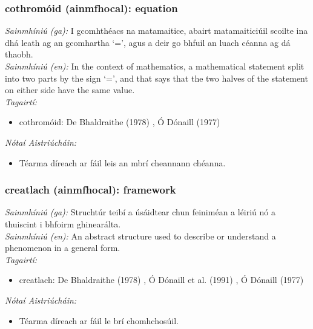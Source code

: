 \subsubsection*{cothromóid (ainmfhocal): equation}
 \noindent \textit{Sainmhíniú (ga):} I gcomhthéacs na matamaitice, abairt matamaiticiúil scoilte ina dhá leath ag an gcomhartha `=', agus a deir go bhfuil an luach céanna ag dá thaobh.
\\
 \noindent \textit{Sainmhíniú (en):} In the context of mathematics, a mathematical statement split into two parts by the sign `=', and that says that the two halves of the statement on either side have the same value.
\\
 \noindent \textit{Tagairtí:}
\begin{itemize}
	\item cothromóid: De Bhaldraithe (1978) \cite{de-bhaldraithe}, Ó Dónaill (1977) \cite{odonaill}
\end{itemize}

 \noindent \textit{Nótaí Aistriúcháin:}
\begin{itemize}
	\item Téarma díreach ar fáil leis an mbrí cheannann chéanna.
\end{itemize}


\subsubsection*{creatlach (ainmfhocal): framework}
 \noindent \textit{Sainmhíniú (ga):} Struchtúr teibí a úsáidtear chun feiniméan a léiriú nó a thuiscint i bhfoirm ghinearálta.
\\
 \noindent \textit{Sainmhíniú (en):} An abstract structure used to describe or understand a phenomenon in a general form.
\\
 \noindent \textit{Tagairtí:}
\begin{itemize}
	\item creatlach: De Bhaldraithe (1978) \cite{de-bhaldraithe}, Ó Dónaill et al. (1991) \cite{focloir-beag}, Ó Dónaill (1977) \cite{odonaill}
\end{itemize}

 \noindent \textit{Nótaí Aistriúcháin:}
\begin{itemize}
	\item Téarma díreach ar fáil le brí chomhchosúil.
\end{itemize}


